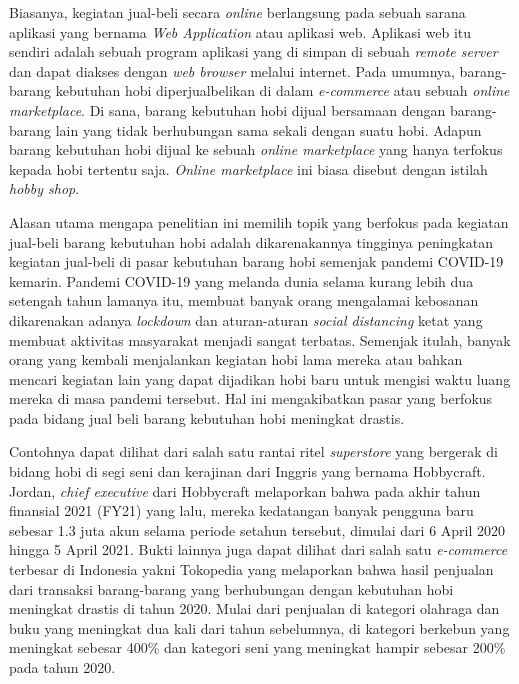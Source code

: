 \documentclass[a4paper]{article}
\begin{document}
Biasanya, kegiatan jual-beli secara \textit{online} berlangsung pada sebuah sarana aplikasi yang bernama \textit{Web Application} atau aplikasi web. Aplikasi web itu sendiri adalah sebuah program aplikasi yang di simpan di sebuah \textit{remote server} dan dapat diakses dengan \textit{web browser} melalui internet\autocite{what-is-web-app}. Pada umumnya, barang-barang kebutuhan hobi diperjualbelikan di dalam \textit{e-commerce} atau sebuah \textit{online marketplace}. Di sana, barang kebutuhan hobi dijual bersamaan dengan barang-barang lain yang tidak berhubungan sama sekali dengan suatu hobi. Adapun barang kebutuhan hobi dijual ke sebuah \textit{online marketplace} yang hanya terfokus kepada hobi tertentu saja. \textit{Online marketplace} ini biasa disebut dengan istilah \textit{hobby shop}.

Alasan utama mengapa penelitian ini memilih topik yang berfokus pada kegiatan jual-beli barang kebutuhan hobi adalah dikarenakannya tingginya peningkatan kegiatan jual-beli di pasar kebutuhan barang hobi semenjak pandemi COVID-19 kemarin. Pandemi COVID-19 yang melanda dunia selama kurang lebih dua setengah tahun lamanya itu, membuat banyak orang mengalamai kebosanan dikarenakan adanya \textit{lockdown} dan aturan-aturan \textit{social distancing} ketat yang membuat aktivitas masyarakat menjadi sangat terbatas\autocite{boredom-in-covid-19-pandemic}. Semenjak itulah, banyak orang yang kembali menjalankan kegiatan hobi lama mereka atau bahkan mencari kegiatan lain yang dapat dijadikan hobi baru untuk mengisi waktu luang mereka di masa pandemi tersebut. Hal ini mengakibatkan pasar yang berfokus pada bidang jual beli barang kebutuhan hobi meningkat drastis.

Contohnya dapat dilihat dari salah satu rantai ritel \textit{superstore} yang bergerak di bidang hobi di segi seni dan kerajinan dari Inggris yang bernama Hobbycraft. Jordan, \textit{chief executive} dari Hobbycraft melaporkan bahwa pada akhir tahun finansial 2021 (FY21) yang lalu, mereka kedatangan banyak pengguna baru sebesar 1.3 juta akun selama periode setahun tersebut, dimulai dari 6 April 2020 hingga 5 April 2021\autocite{hobbycraft-fast-online-growth}. Bukti lainnya juga dapat dilihat dari salah satu \textit{e-commerce} terbesar di Indonesia yakni Tokopedia yang melaporkan bahwa hasil penjualan dari transaksi barang-barang yang berhubungan dengan kebutuhan hobi meningkat drastis di tahun 2020. Mulai dari penjualan di kategori olahraga dan buku yang meningkat dua kali dari tahun sebelumnya, di kategori berkebun yang meningkat sebesar 400\% dan kategori seni yang meningkat hampir sebesar 200\% pada tahun 2020\autocite{tokped-hobbies-goods-sales-increased}.
\end{document}
